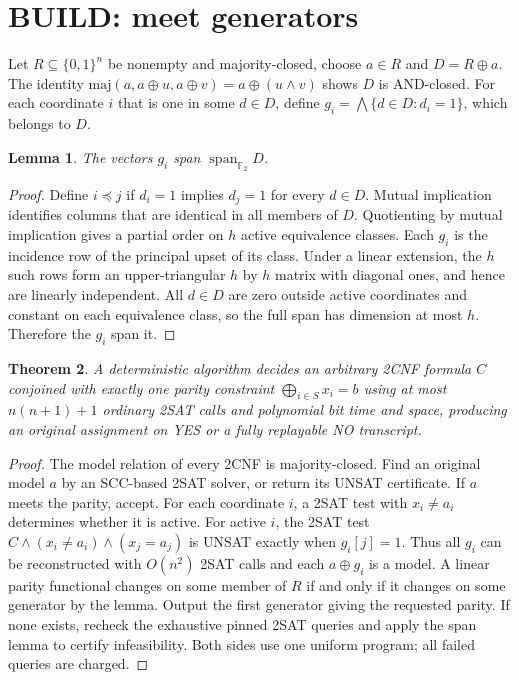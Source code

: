 \documentclass[11pt]{article}
\newtheorem{theorem}{Theorem}
\newtheorem{lemma}[theorem]{Lemma}
\begin{document}
\section{BUILD: meet generators}
Let $R\subseteq\{0,1\}^n$ be nonempty and majority-closed,
choose $a\in R$ and $D=R\oplus a$. The identity
$\mathrm{maj}(a,a\oplus u,a\oplus v)=a\oplus(u\wedge v)$
shows $D$ is AND-closed. For each coordinate $i$ that is
one in some $d\in D$, define
$g_i=\bigwedge\{d\in D:d_i=1\}$, which belongs to $D$.
\begin{lemma}
The vectors $g_i$ span $\operatorname{span}_{\mathbb F_2}D$.
\end{lemma}
\begin{proof}
Define $i\preceq j$ if $d_i=1$ implies $d_j=1$ for
every $d\in D$. Mutual implication identifies columns that
are identical in all members of $D$. Quotienting by mutual implication
gives a partial order on $h$ active equivalence classes.
Each $g_i$ is the incidence row of the principal upset of its class.
Under a linear extension, the $h$ such rows form an upper-triangular
$h$ by $h$ matrix with diagonal ones, and hence are linearly independent.
All $d\in D$ are zero outside active coordinates and constant
on each equivalence class, so the full span has dimension at most $h$.
Therefore the $g_i$ span it.
\end{proof}
\begin{theorem}
A deterministic algorithm decides an arbitrary 2CNF formula $C$
conjoined with exactly one parity constraint
$\bigoplus_{i\in S}x_i=b$
using at most $n(n+1)+1$ ordinary 2SAT calls and polynomial bit time
and space, producing an original assignment on YES or a
fully replayable NO transcript.
\end{theorem}
\begin{proof}
The model relation of every 2CNF is majority-closed.
Find an original model $a$ by an SCC-based 2SAT solver, or
return its UNSAT certificate. If $a$ meets the parity, accept.
For each coordinate $i$, a 2SAT test with $x_i\ne a_i$
determines whether it is active. For active $i$, the 2SAT
test $C\land(x_i\ne a_i)\land(x_j=a_j)$ is UNSAT
exactly when $g_i[j]=1$. Thus all $g_i$ can be reconstructed
with $O(n^2)$ 2SAT calls and each $a\oplus g_i$ is a model.
A linear parity functional changes on some member of $R$
if and only if it changes on some generator by the lemma.
Output the first generator giving the requested parity.
If none exists, recheck the exhaustive pinned 2SAT queries
and apply the span lemma to certify infeasibility. Both sides
use one uniform program; all failed queries are charged.
\end{proof}
\end{document}
